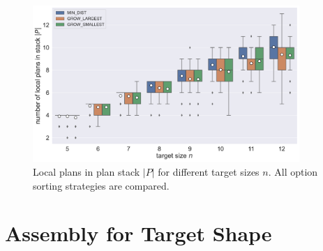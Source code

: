 \begin{figure}
	\centering
	\includegraphics[width=0.9\textwidth]{figures/plots/AFN_ltg.pdf}
	\caption[Local plans in plan stack for different target sizes]{Local plans in plan stack $|P|$ for different target sizes $n$. All option sorting strategies are compared.}
	\label{fig:AFN_ltg}
\end{figure}




\section{Assembly for Target Shape}

